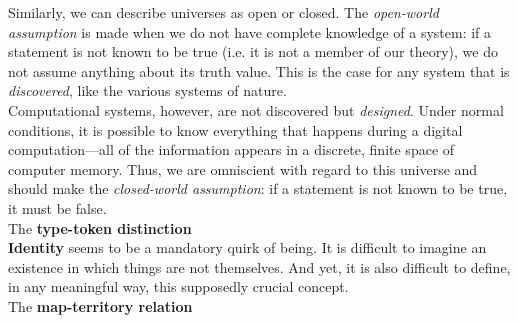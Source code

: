 Similarly, we can describe universes as open or closed. The \textit{open-world assumption} is made when we do not have complete knowledge of a system: if a statement is not known to be true (i.e. it is not a member of our theory), we do not assume anything about its truth value. This is the case for any system that is \textit{discovered}, like the various systems of nature. \\

Computational systems, however, are not discovered but \textit{designed}. Under normal conditions, it is possible to know everything that happens during a digital computation---all of the information appears in a discrete, finite space of computer memory. Thus, we are omniscient with regard to this universe and should make the \textit{closed-world assumption}: if a statement is not known to be true, it must be false. \\

The \textbf{type-token distinction} \\

\textbf{Identity} seems to be a mandatory quirk of being. It is difficult to imagine an existence in which things are not themselves. And yet, it is also difficult to define, in any meaningful way, this supposedly crucial concept. \\

The \textbf{map-territory relation} \\

